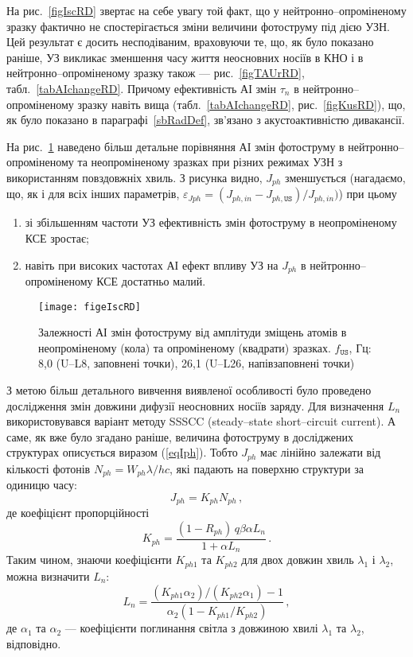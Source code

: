 На рис.~\ref{figIscRD} звертає на себе увагу той факт, що у нейтронно--опроміненому
зразку фактично не спостерігається зміни величини фотоструму під дією УЗН.
Цей результат є досить несподіваним, враховуючи те, що, як було показано раніше,
УЗ викликає зменшення часу життя неосновних носіїв в КНО і в нейтронно--опроміненому зразку також ---
 рис.~\ref{figTAUrRD}, табл.~\ref{tabAIchangeRD}.
Причому ефективність АІ змін $\tau_n$ в нейтронно--опроміненому зразку навіть вища (табл.~\ref{tabAIchangeRD}, рис.~\ref{figKusRD}),
що, як було показано в параграфі~\ref{sbRadDef}, зв'язано з акустоактивністю дивакансії.

На рис.~\ref{figeIscRD} наведено більш детальне порівняння АІ змін фотоструму в нейтронно--опроміненому та неопроміненому
зразках при різних режимах УЗН з використанням повздовжніх хвиль.
З рисунка видно, $J_{ph}$ зменшується (нагадаємо, що, як і для всіх інших параметрів, $\varepsilon_{Jph}=(J_{ph,in}-J_{ph,\mathtt{US}})/{J_{ph,in}})$) при цьому
\begin{enumerate}[label=\asbuk*),leftmargin=0em,itemindent=1.5em]
\item зі збільшенням частоти УЗ ефективність змін фотоструму в неопроміненому КСЕ зростає;
\item навіть при високих частотах АІ ефект впливу УЗ на $J_{ph}$ в нейтронно--опроміненому КСЕ достатньо малий.
\end{enumerate}


\begin{figure}
\center
\texttt{[image: figeIscRD]}
\caption{\label{figeIscRD}
Залежності АІ змін фотоструму від
амплітуди зміщень атомів в неопроміненому (кола)
та опроміненому (квадрати) зразках.
$f_\mathtt{US}$, Гц: 8,0 (U--L8, заповнені точки),
26,1 (U--L26, напівзаповнені точки)
}%
\end{figure}

З метою більш детального вивчення виявленої особливості було проведено дослідження змін
довжини дифузії неосновних носіїв заряду.
Для визначення $L_n$ використовувався варіант методу SSSCC (steady--state short--circuit current)\cite{Schroder2006}.
А саме, як вже було згадано раніше, величина фотоструму в досліджених структурах
описується виразом (\ref{eqIph}).
Тобто $J_{ph}$ має лінійно залежати від кількості фотонів
\mbox{$N_{ph}=W_{ph}\lambda /hc$}, які падають на поверхню структури за одиницю часу:
\begin{equation}
J_{ph}=K_{ph}N_{ph}\,,
\end{equation}
де коефіцієнт пропорційності
\begin{equation}
 K_{ph}=\frac{(1-R_{ph})\,q\beta \alpha L_n} {1+\alpha L_n}\,.
\end{equation}
Таким чином, знаючи коефіцієнти $K_{ph1}$ та $K_{ph2}$
для двох довжин хвиль $\lambda_1$ і $\lambda_2$, можна
визначити $L_n$:
\begin{equation}\label{F3}
L_n=\frac{(K_{ph1}\alpha_2)/(K_{ph2}\alpha_1)-1}{\alpha_2(1-K_{ph1}/K_{ph2})}\,,
\end{equation}
де $\alpha_1$ та $\alpha_2$ --- коефіцієнти поглинання світла з довжиною хвилі $\lambda_1$ та $\lambda_2$, відповідно.

